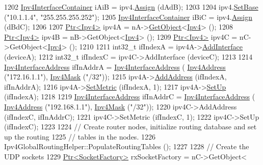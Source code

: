 \begin{DoxyCode}
1202   \hyperlink{classns3_1_1Ipv4InterfaceContainer}{Ipv4InterfaceContainer} iAiB = ipv4.\hyperlink{classns3_1_1Ipv4AddressHelper_af8e7f4a1a7e74c00014a1eac445a27af}{Assign} (dAdB);
1203 
1204   ipv4.\hyperlink{classns3_1_1Ipv4AddressHelper_acf7b16dd25bac67e00f5e25f90a9a035}{SetBase} (\textcolor{stringliteral}{"10.1.1.4"}, \textcolor{stringliteral}{"255.255.255.252"});
1205   \hyperlink{classns3_1_1Ipv4InterfaceContainer}{Ipv4InterfaceContainer} iBiC = ipv4.\hyperlink{classns3_1_1Ipv4AddressHelper_af8e7f4a1a7e74c00014a1eac445a27af}{Assign} (dBdC);
1206 
1207   \hyperlink{classns3_1_1Ptr}{Ptr<Ipv4>} ipv4A = nA->\hyperlink{classns3_1_1Object_a13e18c00017096c8381eb651d5bd0783}{GetObject}<\hyperlink{classns3_1_1Ipv4}{Ipv4}> ();
1208   \hyperlink{classns3_1_1Ptr}{Ptr<Ipv4>} ipv4B = nB->GetObject<\hyperlink{classns3_1_1Ipv4}{Ipv4}> ();
1209   \hyperlink{classns3_1_1Ptr}{Ptr<Ipv4>} ipv4C = nC->GetObject<\hyperlink{classns3_1_1Ipv4}{Ipv4}> ();
1210 
1211   int32\_t ifIndexA = ipv4A->\hyperlink{classns3_1_1Ipv4_a637354128b71bc587ea5a6eeaef42469}{AddInterface} (deviceA);
1212   int32\_t ifIndexC = ipv4C->AddInterface (deviceC);
1213 
1214   \hyperlink{classns3_1_1Ipv4InterfaceAddress}{Ipv4InterfaceAddress} ifInAddrA = \hyperlink{classns3_1_1Ipv4InterfaceAddress}{Ipv4InterfaceAddress} (
      \hyperlink{classns3_1_1Ipv4Address}{Ipv4Address} (\textcolor{stringliteral}{"172.16.1.1"}), \hyperlink{classns3_1_1Ipv4Mask}{Ipv4Mask} (\textcolor{stringliteral}{"/32"}));
1215   ipv4A->\hyperlink{classns3_1_1Ipv4_ad203526cae6a4b86f1bb89e44d2b62f7}{AddAddress} (ifIndexA, ifInAddrA);
1216   ipv4A->\hyperlink{classns3_1_1Ipv4_a2b5632573b67957fabe2dfea248a57a3}{SetMetric} (ifIndexA, 1);
1217   ipv4A->\hyperlink{classns3_1_1Ipv4_a71b2f8acca4923aef907b50b3196bf23}{SetUp} (ifIndexA);
1218 
1219   \hyperlink{classns3_1_1Ipv4InterfaceAddress}{Ipv4InterfaceAddress} ifInAddrC = \hyperlink{classns3_1_1Ipv4InterfaceAddress}{Ipv4InterfaceAddress} (
      \hyperlink{classns3_1_1Ipv4Address}{Ipv4Address} (\textcolor{stringliteral}{"192.168.1.1"}), \hyperlink{classns3_1_1Ipv4Mask}{Ipv4Mask} (\textcolor{stringliteral}{"/32"}));
1220   ipv4C->AddAddress (ifIndexC, ifInAddrC);
1221   ipv4C->SetMetric (ifIndexC, 1);
1222   ipv4C->SetUp (ifIndexC);
1223 
1224   \textcolor{comment}{// Create router nodes, initialize routing database and set up the routing}
1225   \textcolor{comment}{// tables in the nodes.}
1226   Ipv4GlobalRoutingHelper::PopulateRoutingTables ();
1227 
1228   \textcolor{comment}{// Create the UDP sockets}
1229   \hyperlink{classns3_1_1Ptr}{Ptr<SocketFactory>} rxSocketFactory = nC->GetObject<

\end{DoxyCode}
